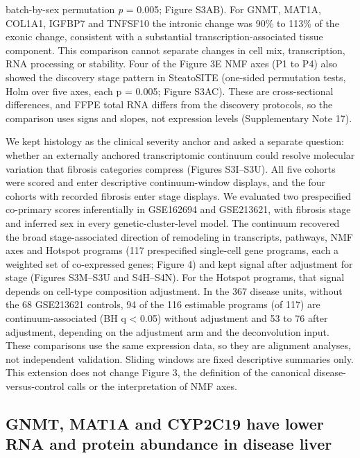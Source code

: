 batch-by-sex permutation \emph{p} = 0.005; Figure S3AB). For GNMT, MAT1A, COL1A1, IGFBP7 and TNFSF10 the intronic change was 90\% to 113\% of the exonic change, consistent with a substantial transcription-associated tissue component. This comparison cannot separate changes in cell mix, transcription, RNA processing or stability. Four of the Figure 3E NMF axes (P1 to P4) also showed the discovery stage pattern in SteatoSITE (one-sided permutation tests, Holm over five axes, each p = 0.005; Figure S3AC). These are cross-sectional differences, and FFPE total RNA differs from the discovery protocols, so the comparison uses signs and slopes, not expression levels (Supplementary Note 17).

We kept histology as the clinical severity anchor and asked a separate question: whether an externally anchored transcriptomic continuum could resolve molecular variation that fibrosis categories compress (Figures S3I--S3U). All five cohorts were scored and enter descriptive continuum-window displays, and the four cohorts with recorded fibrosis enter stage displays. We evaluated two prespecified co-primary scores inferentially in GSE162694 and GSE213621, with fibrosis stage and inferred sex in every genetic-cluster-level model. The continuum recovered the broad stage-associated direction of remodeling in transcripts, pathways, NMF axes and Hotspot programs (117 prespecified single-cell gene programs, each a weighted set of co-expressed genes; Figure 4) and kept signal after adjustment for stage (Figures S3M--S3U and S4H--S4N). For the Hotspot programs, that signal depends on cell-type composition adjustment. In the 367 disease units, without the 68 GSE213621 controls, 94 of the 116 estimable programs (of 117) are continuum-associated (BH q \textless{} 0.05) without adjustment and 53 to 76 after adjustment, depending on the adjustment arm and the deconvolution input. These comparisons use the same expression data, so they are alignment analyses, not independent validation. Sliding windows are fixed descriptive summaries only. This extension does not change Figure 3, the definition of the canonical disease-versus-control calls or the interpretation of NMF axes.

\subsection{GNMT, MAT1A and CYP2C19 have lower RNA and protein abundance in disease liver}\label{gnmt-mat1a-and-cyp2c19-have-lower-rna-and-protein-abundance-in-disease-liver}

